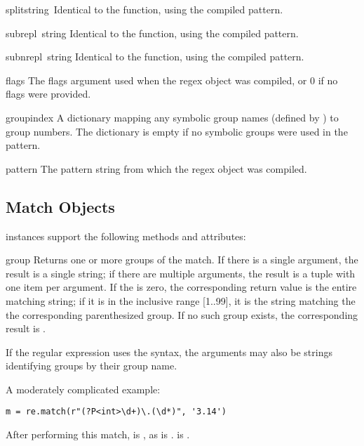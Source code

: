 \begin{funcdesc}{split}{string\, }
Identical to the  function, using the compiled pattern.
\end{funcdesc}

\begin{funcdesc}{sub}{repl\, string}
Identical to the  function, using the compiled pattern.
\end{funcdesc}

\begin{funcdesc}{subn}{repl\, string}
Identical to the  function, using the compiled pattern.
\end{funcdesc}

\renewcommand{\indexsubitem}{(regex attribute)}

\begin{datadesc}{flags}
The flags argument used when the regex object was compiled, or 0 if no
flags were provided.
\end{datadesc}

\begin{datadesc}{groupindex}
A dictionary mapping any symbolic group names (defined by 
) to group numbers.  The dictionary is empty if no
symbolic groups were used in the pattern.
\end{datadesc}

\begin{datadesc}{pattern}
The pattern string from which the regex object was compiled.
\end{datadesc}

\subsection{Match Objects}

 instances support the following methods and attributes:

\begin{funcdesc}{group}{}
Returns one or more groups of the match.  If there is a single
 argument, the result is a single string; if there are
multiple arguments, the result is a tuple with one item per argument.
If the  is zero, the corresponding return value is the
entire matching string; if it is in the inclusive range [1..99], it is
the string matching the the corresponding parenthesized group.  If no
such group exists, the corresponding result is
.

If the regular expression uses the  syntax,
the  arguments may also be strings identifying groups by
their group name.

A moderately complicated example:

\begin{verbatim}
m = re.match(r"(?P<int>\d+)\.(\d*)", '3.14')
\end{verbatim}

After performing this match,  is , as is
.   is .
\end{funcdesc}

